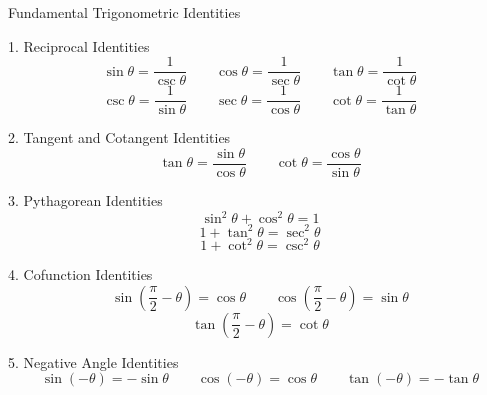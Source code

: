 Fundamental Trigonometric Identities

1. Reciprocal Identities
$$ \sin\theta = \frac{1}{\csc\theta} \qquad \cos\theta = \frac{1}{\sec\theta} \qquad \tan\theta = \frac{1}{\cot\theta} $$
$$ \csc\theta = \frac{1}{\sin\theta} \qquad \sec\theta = \frac{1}{\cos\theta} \qquad \cot\theta = \frac{1}{\tan\theta} $$

2. Tangent and Cotangent Identities
$$ \tan\theta = \frac{\sin\theta}{\cos\theta} \qquad \cot\theta = \frac{\cos\theta}{\sin\theta} $$

3. Pythagorean Identities
$$ \sin^2\theta + \cos^2\theta = 1 $$
$$ 1 + \tan^2\theta = \sec^2\theta $$
$$ 1 + \cot^2\theta = \csc^2\theta $$

4. Cofunction Identities
$$ \sin\!\left(\frac{\pi}{2} - \theta\right) = \cos\theta \qquad \cos\!\left(\frac{\pi}{2} - \theta\right) = \sin\theta $$
$$ \tan\!\left(\frac{\pi}{2} - \theta\right) = \cot\theta $$

5. Negative Angle Identities
$$ \sin(-\theta) = -\sin\theta \qquad \cos(-\theta) = \cos\theta \qquad \tan(-\theta) = -\tan\theta $$

